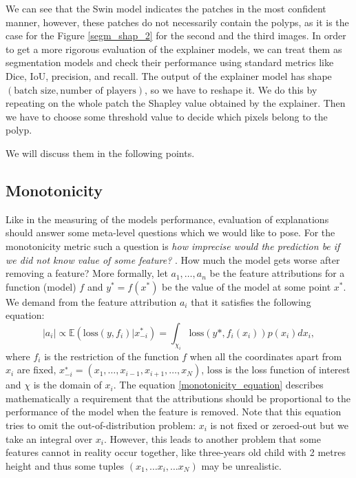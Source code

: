 \documentclass[magisterska,en]{pracamgr}
\begin{document}
We can see that the Swin model indicates the patches in the most confident manner, however, these patches do not necessarily contain the polyps, as it is the case for the Figure \ref{segm_shap_2} for the second and the third images. In order to get a more rigorous evaluation of the explainer models, we can treat them as segmentation models and check their performance using standard metrics like Dice, IoU, precision, and recall. The output of the explainer model has shape $(\textrm{batch size}, \textrm{number of players})$, so we have to reshape it. We do this by repeating on the whole patch the Shapley value obtained by the explainer. Then we have to choose some threshold value to decide which pixels belong to the polyp.





We will discuss them in the following points.


\subsection{Monotonicity}
Like in the measuring of the models performance, evaluation of explanations should answer some meta-level questions which we would like to pose. For the monotonicity metric such a question is \textit{how imprecise would the prediction be if we did not know value of some feature?} \cite{DBLP:journals/corr/abs-2007-07584}. How much the model gets worse after removing a feature? More formally, let $a_1, \ldots, a_n$ be the feature attributions for a function (model) $f$ and $y^* = f(x^*)$ be the value of the model at some point $x^*$. We demand from the feature attribution $a_i$ that it satisfies the following equation:
\begin{equation} \label{monotonicity_equation}
    |a_i| \propto  \mathbb{E}\left(\textrm{loss}(y, f_i) | x_{-i}^*\right)  =  \int _{\chi _i} \textrm{loss} \left(y*, f_i(x_i)\right)p(x_i)dx_i ,
\end{equation}
where $f_i$ is the restriction of the function $f$ when all the coordinates apart from $x_i$ are fixed, $x^{∗}_{-i} = (x_1, \ldots, x_{i−1}, x_{i+1}, \ldots, x_N)$,
$\textrm{loss}$ is the loss function of interest and $\chi$ is the domain of $x_i$. The equation \ref{monotonicity_equation} describes mathematically a requirement that the attributions should be proportional to the performance of the model when the feature is removed. Note that this equation tries to omit the out-of-distribution problem: $x_i$ is not fixed or zeroed-out but we take an integral over $x_i$. However, this leads to another problem that some features cannot in reality occur together, like three-years old child with 2 metres height and thus some tuples $(x_1, \ldots x_i, \ldots x_N)$ may be unrealistic.
\end{document}
